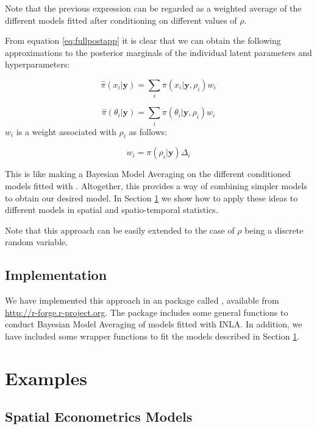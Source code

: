 \documentclass[article]{jss}
\begin{document}
Note that the previous expression can be regarded as a weighted average
of the different models fitted after conditioning on different values of
$\rho$.

From equation \ref{eq:fullpostapp} it is clear that we can obtain the following
approximations to the posterior marginals of the individual latent parameters
and hyperparameters:

$$
\hat{\pi}(x_i|\mathbf{y}) = \sum_i \pi(x_i|\mathbf{y}, \rho_i) w_i
$$

$$
\hat{\pi}(\theta_i|\mathbf{y}) = \sum_i \pi(\theta_i|\mathbf{y}, \rho_i) w_i
$$
\noindent
$w_i$ is a weight associated with $\rho_i$ as follows:

$$
w_i = \pi(\rho_i|\mathbf{y})\Delta_i
$$

This is like making a Bayesian Model Averaging \citep{Hoetingetal:1999} on the
different conditioned models fitted with . Altogether, this
provides a way of combining simpler models to obtain our desired model. In
Section \ref{sec:examples} we show how to apply these ideas to different models
in spatial and spatio-temporal statistics.


%

Note that this approach can be easily extended to the case of $\rho$ being
a discrete random variable.


\subsection{Implementation}

We have implemented this approach in an  package called ,
available from \url{http://r-forge.r-project.org}. The package includes some
general functions to conduct Bayesian Model Averaging of models fitted with
INLA. In addition, we have included some wrapper functions to fit the models
described in Section \ref{sec:examples}.


\section{Examples}
\label{sec:examples}


\subsection{Spatial Econometrics Models}
\end{document}
